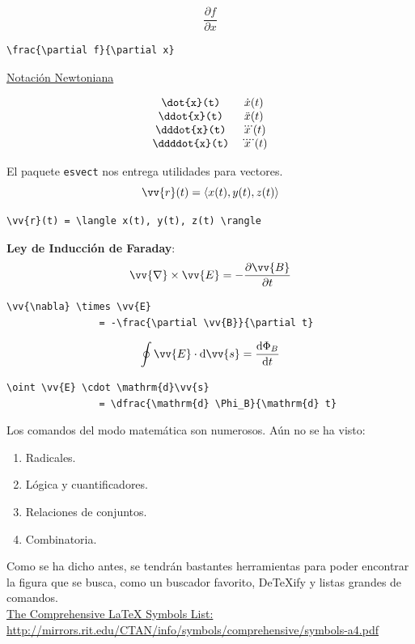 \documentclass[../notes.tex]{subfiles}
\begin{document}
        	\[ \frac{\partial f}{\partial x} \]
\begin{verbatim}
\frac{\partial f}{\partial x}
\end{verbatim}
        	\underline{Notación Newtoniana}
        	
        	\[   
        		\begin{array}{cc}      
        			\text{\texttt{\textbackslash{}dot\{x\}(t)}} & \dot{x}(t)\\
        			\text{\texttt{\textbackslash{}ddot\{x\}(t)}} & \ddot{x}(t)\\
        			\text{\texttt{\textbackslash{}dddot\{x\}(t)}} & \dddot{x}(t)\\
        			\text{\texttt{\textbackslash{}ddddot\{x\}(t)}} & \ddddot{x}(t)\\
        		\end{array}
        	\]
        
        El paquete \texttt{esvect} nos entrega utilidades para vectores.
        \[ \vv{r}(t) = \langle x(t), y(t), z(t) \rangle \]
        \begin{verbatim}
\vv{r}(t) = \langle x(t), y(t), z(t) \rangle
        \end{verbatim}
            
        \textbf{Ley de Inducción de Faraday}:
        \[ \vv{\nabla} \times \vv{E} = - \frac{\partial \vv{B}}{\partial t} \]
        \begin{verbatim}
\vv{\nabla} \times \vv{E} 
                = -\frac{\partial \vv{B}}{\partial t}
        \end{verbatim}
        \[ \oint \vv{E} \cdot \text{d}\vv{s} = \dfrac{\text{d} \Phi_B}{\text{d} t} \]
        \begin{verbatim}
\oint \vv{E} \cdot \mathrm{d}\vv{s} 
                = \dfrac{\mathrm{d} \Phi_B}{\mathrm{d} t} 
        \end{verbatim}            
        
    	
    		Los comandos del modo matemática son numerosos. Aún no se ha visto:
                \begin{enumerate}
                	\item Radicales.
                	\item Lógica y cuantificadores.
                	\item Relaciones de conjuntos.
                	\item Combinatoria.
                \end{enumerate}
            Como se ha dicho antes, se tendrán bastantes herramientas para poder encontrar la figura que se busca, como un buscador favorito, DeTeXify y listas grandes de comandos.\\[\baselineskip]
            
            \href{http://mirrors.rit.edu/CTAN/info/symbols/comprehensive/symbols-a4.pdf}{The Comprehensive \LaTeX{} Symbols List: http://mirrors.rit.edu/CTAN/info/symbols/comprehensive/symbols-a4.pdf}

        
\end{document}
